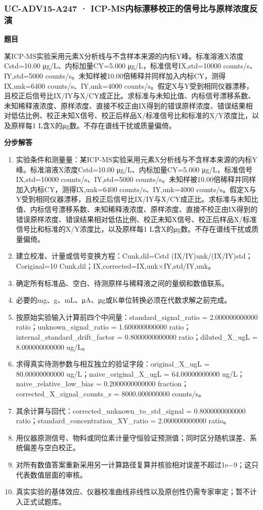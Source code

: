 \documentclass[UTF8,11pt,a4paper]{ctexart}
\begin{document}
\subsubsection*{UC-ADV15-A247 · ICP-MS内标漂移校正的信号比与原样浓度反演}
\noindent\textbf{题目}\par
某ICP-MS实验采用元素X分析线与不含样本来源的内标Y峰。标准溶液X浓度Cstd=10.00 μg/L、内标加量CY=5.000 μg/L，标准信号IX,std=10000 counts/s、IY,std=5000 counts/s。未知样被10.00倍稀释并同样加入内标CY，测得IX,unk=6400 counts/s、IY,unk=4000 counts/s。假定X与Y受到相同仪器漂移，且校正后信号比IX/IY与X/CY成正比。求标准与未知比值、内标信号漂移系数、未知稀释液浓度、原样浓度、直接不校正由IX得到的错误原样浓度、错误结果相对低估比例、校正未知X信号、校正后样品X/标准信号比和标准的X/Y浓度比，以及原样每1 L含X的μg数。不存在谱线干扰或质量偏倚。\par
\medskip\noindent\textbf{分步解答}
\begin{enumerate}
\item 实验条件和测量量：某ICP-MS实验采用元素X分析线与不含样本来源的内标Y峰。标准溶液X浓度Cstd=10.00 μg/L、内标加量CY=5.000 μg/L，标准信号IX,std=10000 counts/s、IY,std=5000 counts/s。未知样被10.00倍稀释并同样加入内标CY，测得IX,unk=6400 counts/s、IY,unk=4000 counts/s。假定X与Y受到相同仪器漂移，且校正后信号比IX/IY与X/CY成正比。求标准与未知比值、内标信号漂移系数、未知稀释液浓度、原样浓度、直接不校正由IX得到的错误原样浓度、错误结果相对低估比例、校正未知X信号、校正后样品X/标准信号比和标准的X/Y浓度比，以及原样每1 L含X的μg数。不存在谱线干扰或质量偏倚。
\item 建立校准、计量或信号变换方程：Cunk,dil=Cstd (IX/IY)unk/(IX/IY)std；Coriginal=10 Cunk,dil；IX,corrected=IX,unk×IY,std/IY,unk。
\item 确定所有标准品、空白、待测原样与稀释液之间的量纲和数值联系。
\item 必要的mg、g、mL、μA、μg或K单位转换必须在代数求解之前完成。
\item 按原始实验输入计算前四个中间量：standard\_signal\_ratio = 2.000000000000 ratio；unknown\_signal\_ratio = 1.600000000000 ratio；internal\_standard\_drift\_factor = 0.8000000000000 ratio；diluted\_X\_ugL = 8.000000000000 ug/L。
\item 求得真实待测参数与相互独立的验证字段：original\_X\_ugL = 80.00000000000 ug/L；naive\_original\_X\_ugL = 64.00000000000 ug/L；naive\_relative\_low\_bias = 0.2000000000000 fraction；corrected\_X\_signal\_counts\_s = 8000.000000000 counts/s。
\item 其余计算与回代：corrected\_unknown\_to\_std\_signal = 0.8000000000000 ratio；standard\_concentration\_XY\_ratio = 2.000000000000 ratio。
\item 用仪器原测信号、物料或同位素计量守恒验证预测值；同时区分随机误差、系统偏差与空白校正。
\item 对所有数值答案重新采用另一计算路径复算并核验相对误差不超过1e−9；这只代表数值层面的审核。
\item 真实实验的基体效应、仪器校准曲线非线性以及原创性仍需专家审定；暂不计入正式试题库。
\end{enumerate}
\end{document}
